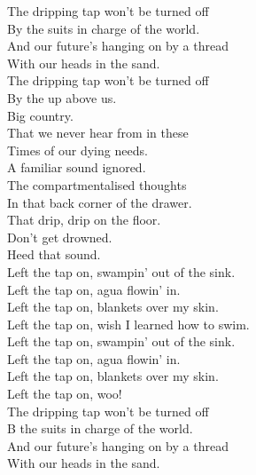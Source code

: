 
\label{album:omnium-gatherum}





The dripping tap won't be turned off \\
By the suits in charge of the world. \\
And our future's hanging on by a thread \\
With our heads in the sand. \\

The dripping tap won't be turned off \\
By the  up above us. \\
Big  country. \\
That we never hear from in these \\
Times of our dying needs. \\

A familiar sound ignored. \\
The compartmentalised thoughts \\
In that back corner of the drawer. \\
That drip, drip on the floor. \\
Don't get drowned. \\
Heed that sound. \\

Left the tap on, swampin' out of the sink. \\
Left the tap on, agua flowin' in. \\
Left the tap on, blankets over my skin. \\
Left the tap on, wish I learned how to swim. \\

Left the tap on, swampin' out of the sink. \\
Left the tap on, agua flowin' in. \\
Left the tap on, blankets over my skin. \\
Left the tap on, woo! \\

The dripping tap won't be turned off \\
B the suits in charge of the world. \\
And our future's hanging on by a thread \\
With our heads in the sand. \\

